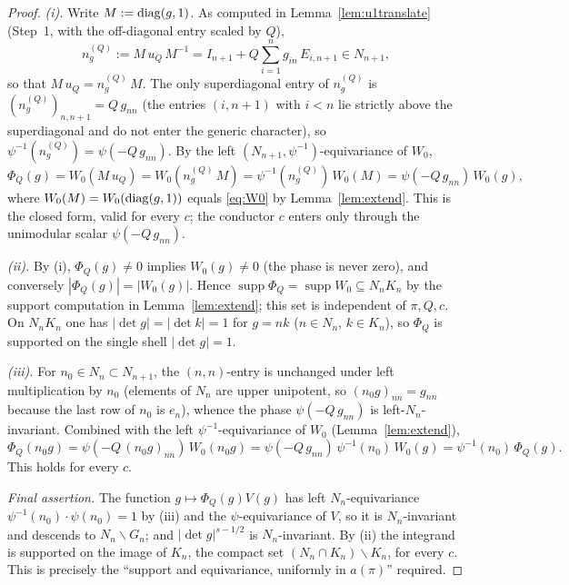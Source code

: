 \begin{proof}
\emph{(i).} Write $M:=\operatorname{diag}(g,1)$. As computed in Lemma~\ref{lem:u1translate}
\textup{(}Step~1, with the off-diagonal entry scaled by $Q$\textup{)},
\[
n_g^{(Q)}:=M\,u_Q\,M^{-1}=I_{n+1}+Q\sum_{i=1}^{n}g_{in}\,E_{i,n+1}\in N_{n+1},
\]
so that $M\,u_Q=n_g^{(Q)}\,M$. The only superdiagonal entry of $n_g^{(Q)}$ is
$(n_g^{(Q)})_{n,n+1}=Q\,g_{nn}$ \textup{(}the entries $(i,n+1)$ with $i<n$ lie strictly above the
superdiagonal and do not enter the generic character\textup{)}, so
$\psi^{-1}(n_g^{(Q)})=\psi(-Q\,g_{nn})$. By the left $(N_{n+1},\psi^{-1})$-equivariance of $W_0$,
\[
\Phi_Q(g)=W_0(M\,u_Q)=W_0(n_g^{(Q)}\,M)=\psi^{-1}(n_g^{(Q)})\,W_0(M)=\psi(-Q\,g_{nn})\,W_0(g),
\]
where $W_0(M)=W_0(\operatorname{diag}(g,1))$ equals \eqref{eq:W0} by Lemma~\ref{lem:extend}. This is the
closed form, valid for every $c$; the conductor $c$ enters only through the unimodular scalar
$\psi(-Q\,g_{nn})$.

\emph{(ii).} By (i), $\Phi_Q(g)\ne0$ implies $W_0(g)\ne0$ \textup{(}the phase is never zero\textup{)},
and conversely $|\Phi_Q(g)|=|W_0(g)|$. Hence
$\operatorname{supp}\Phi_Q=\operatorname{supp}W_0\subseteq N_nK_n$ by the support computation in
Lemma~\ref{lem:extend}; this set is independent of $\pi,Q,c$. On $N_nK_n$ one has
$|\det g|=|\det k|=1$ for $g=n k$ \textup{(}$n\in N_n$, $k\in K_n$\textup{)}, so $\Phi_Q$ is
supported on the single shell $|\det g|=1$.

\emph{(iii).} For $n_0\in N_n\subset N_{n+1}$, the $(n,n)$-entry is unchanged under left
multiplication by $n_0$ \textup{(}elements of $N_n$ are upper unipotent, so $(n_0 g)_{nn}=g_{nn}$
because the last row of $n_0$ is $e_n$\textup{)}, whence the phase $\psi(-Q\,g_{nn})$ is
left-$N_n$-invariant. Combined with the left $\psi^{-1}$-equivariance of $W_0$
\textup{(}Lemma~\ref{lem:extend}\textup{)},
\[
\Phi_Q(n_0 g)=\psi(-Q\,(n_0g)_{nn})\,W_0(n_0 g)
=\psi(-Q\,g_{nn})\,\psi^{-1}(n_0)\,W_0(g)=\psi^{-1}(n_0)\,\Phi_Q(g).
\]
This holds for every $c$.

\emph{Final assertion.} The function $g\mapsto\Phi_Q(g)V(g)$ has left $N_n$-equivariance
$\psi^{-1}(n_0)\cdot\psi(n_0)=1$ by (iii) and the $\psi$-equivariance of $V$, so it is
$N_n$-invariant and descends to $N_n\backslash G_n$; and $|\det g|^{s-1/2}$ is $N_n$-invariant.
By (ii) the integrand is supported on the image of $K_n$, the compact set
$(N_n\cap K_n)\backslash K_n$, for every $c$. This is precisely the ``support and equivariance,
uniformly in $a(\pi)$'' required.
\end{proof}

